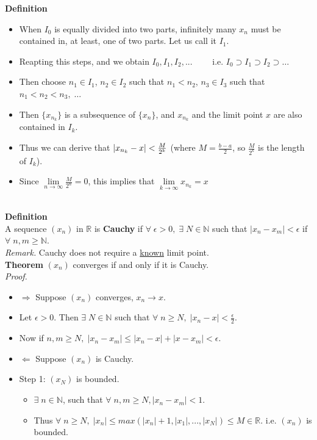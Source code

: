 \documentclass[12pt]{article}
\begin{document}
\begin{block}{\bf Definition}
\begin{itemize}
    
    \item When $I_0$ is equally divided into two parts, infinitely many $x_n$ must be contained in, at least, one of two parts. Let us call it $I_1$.
    \item Reapting this steps, and we obtain $I_0,I_1,I_2,...\qquad$ i.e. $I_0\supset I_1\supset I_2\supset \ldots$
    
    \item Then choose $n_1\in I_1$, $n_2\in I_2$ such that $n_1<n_2$, $n_3\in I_3$ such that $n_1<n_2<n_3,\;\ldots$
    \item Then $\{x_{n_k}\}$ is a subsequence of $\{x_n\}$, and $x_{n_k}$ and the limit point $x$ are also contained in $I_k$.
    \item Thus we can derive that 
    $|x_{n_k}-x| < \frac{M}{2^k}\hfill$
    (where $M = \frac{b-a}{2}$, so $\frac{M}{2^k}$ is the length of $I_k$).
    \item Since $\lim\limits_{n\to\infty} \frac{M}{2^n} = 0$, this implies that $\lim\limits_{k\to\infty} x_{n_k} = x$
\end{itemize}\\

\vspace{1\baselineskip}
\textbf{Definition}\\
A sequence $(x_n)$ in $\mathbb{R}$ is \textbf{Cauchy} if $\forall\;\epsilon > 0,\; \exists \; N \in \mathbb{N}$ such that $|x_n - x_m| < \epsilon$ if $\forall\;n,m \ge \mathbb{N}$.\\

{\sl Remark.} Cauchy does not require a \underline{known} limit point.\\

\vspace{1\baselineskip}
\textbf{Theorem} $(x_n)$ converges if and only if it is Cauchy.\\

{\sl Proof.}
\begin{itemize}
    \item $\Rightarrow$ Suppose $(x_n)$ converges, $x_n \rightarrow x$. 
    \item Let $\epsilon > 0$. Then $\exists\; N \in \mathbb{N}$ such that $\forall\;n\ge N,\; |x_n - x| < \frac{\epsilon}{2}.$
    \item Now if $n,m \ge N,\; |x_n - x_m| \le |x_n-x|+|x-x_m| < \epsilon.$\\
    
    \item $\Leftarrow$ Suppose $(x_n)$ is Cauchy.
    \item Step 1: $(x_N)$ is bounded.
    \begin{itemize}
        \item $\exists\; n \in \mathbb{N}$, such that $\forall\;n,m \ge N, |x_n-x_m|<1$.
        \item Thus $\forall\;n\ge N,\; |x_n| \le max(|x_n| +1, |x_1|,...,|x_N|)\le M\in\mathbb{R}$. \hfiill i.e. $(x_n)$ is bounded.
    \end{itemize}
    

\end{itemize}
\end{block}
\end{document}
